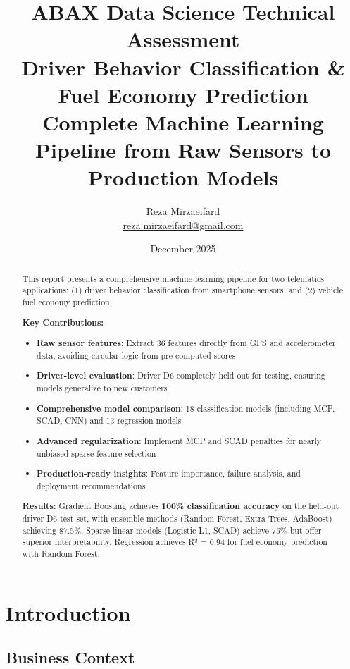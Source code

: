 \documentclass[11pt,a4paper]{article}
\title{
    \vspace{-1cm}
    \textbf{ABAX Data Science Technical Assessment}\\[0.5cm]
    \large Driver Behavior Classification \& Fuel Economy Prediction\\[0.3cm]
    \normalsize Complete Machine Learning Pipeline from Raw Sensors to Production Models
}
\author{
    Reza Mirzaeifard\\
    \small \href{mailto:reza.mirzaeifard@gmail.com}{reza.mirzaeifard@gmail.com}
}
\date{December 2025}
\begin{document}
\maketitle

\begin{abstract}
This report presents a comprehensive machine learning pipeline for two telematics applications: (1) driver behavior classification from smartphone sensors, and (2) vehicle fuel economy prediction.

\textbf{Key Contributions:}
\begin{itemize}[leftmargin=*,nosep]
    \item \textbf{Raw sensor features}: Extract 36 features directly from GPS and accelerometer data, avoiding circular logic from pre-computed scores
    \item \textbf{Driver-level evaluation}: Driver D6 completely held out for testing, ensuring models generalize to new customers
    \item \textbf{Comprehensive model comparison}: 18 classification models (including MCP, SCAD, CNN) and 13 regression models
    \item \textbf{Advanced regularization}: Implement MCP and SCAD penalties for nearly unbiased sparse feature selection
    \item \textbf{Production-ready insights}: Feature importance, failure analysis, and deployment recommendations
\end{itemize}

\textbf{Results:} Gradient Boosting achieves \textbf{100\% classification accuracy} on the held-out driver D6 test set, with ensemble methods (Random Forest, Extra Trees, AdaBoost) achieving 87.5\%. Sparse linear models (Logistic L1, SCAD) achieve 75\% but offer superior interpretability. Regression achieves R² = 0.94 for fuel economy prediction with Random Forest.
\end{abstract}

\tableofcontents
\newpage

\section{Introduction}

\subsection{Business Context}
\end{document}
